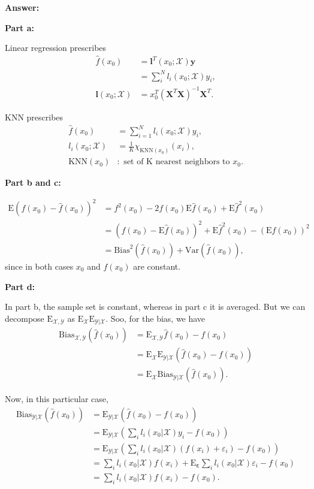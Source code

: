 \documentclass{article}
\begin{document}
\textbf{Answer:}

\textbf{Part a:}

Linear regression prescribes
\begin{align}
	\hat{f}(x_0)&=\mathbf l^T(x_0;\mathcal X)\mathbf y\\
	&=\sum_i^Nl_i(x_0;\mathcal X)y_i,\\
	\mathbf l(x_0;\mathcal X)&=x_0^T\left(\mathbf X^T\mathbf X\right)^{-1}\mathbf X^T.
\end{align}

KNN prescribes
\begin{align}
	\hat{f}(x_0)&=\sum_{i=1}^Nl_i(x_0;\mathcal X)y_i,\\
	l_i(x_0;\mathcal X)&=\frac1K\chi_{\mathrm{KNN}(x_0)}(x_i),\\
	\mathrm{KNN}(x_0)&:\text{ set of K nearest neighbors to }x_0.
\end{align}

\textbf{Part b and c:}

\begin{align}
	\mathrm E\left(f(x_0)-\hat{f}(x_0)\right)^2&=f^2(x_0)-2f(x_0)\mathrm E\hat{f}(x_0)+\mathrm E\hat{f}^2(x_0)\\
	&=\left(f(x_0)-\mathrm E\hat{f}(x_0)\right)^2+\mathrm E\hat{f}^2(x_0)-\left(\mathrm Ef(x_0)\right)^2\\
	&=\mathrm{Bias}^2\left(\hat{f}(x_0)\right)+\mathrm{Var}\left(\hat{f}(x_0)\right),
\end{align}
since in both cases $x_0$ and $f(x_0)$ are constant.

\textbf{Part d:}

In part b, the sample set is constant, whereas in part c it is averaged. But we can decompose $\mathrm E_{\mathcal X,\mathcal Y}$ as $\mathrm E_{\mathcal X}\mathrm E_{\mathcal Y|\mathcal X}$. Soo, for the bias, we have
\begin{align}
	\mathrm{Bias}_{\mathcal X,\mathcal Y}\left(\hat{f}(x_0)\right)&=\mathrm E_{\mathcal X,\mathcal Y}\hat{f}(x_0)-f(x_0)\\
	&=\mathrm E_{\mathcal X}\mathrm E_{\mathcal Y|\mathcal X}\left(\hat{f}(x_0)-f(x_0)\right)\\
	&=\mathrm E_{\mathcal X}\mathrm{Bias}_{\mathcal Y|\mathcal X}\left(\hat{f}(x_0)\right).
\end{align}

Now, in this particular case,
\begin{align}
	\mathrm{Bias}_{\mathcal Y|\mathcal X}\left(\hat{f}(x_0)\right)&=\mathrm E_{\mathcal Y|\mathcal X}\left(\hat{f}(x_0)-f(x_0)\right)\\
	&=\mathrm E_{\mathcal Y|\mathcal X}\left(\sum_il_i(x_0|\mathcal X)y_i-f(x_0)\right)\\
	&=\mathrm E_{\mathcal Y|\mathcal X}\left(\sum_il_i(x_0|\mathcal X)(f(x_i)+\varepsilon_i)-f(x_0)\right)\\
	&=\sum_il_i(x_0|\mathcal X)f(x_i)+\mathrm E_{\pmb\varepsilon}\sum_il_i(x_0|\mathcal X)\varepsilon_i-f(x_0)\\
	&=\sum_il_i(x_0|\mathcal X)f(x_i)-f(x_0).
\end{align}
\end{document}

